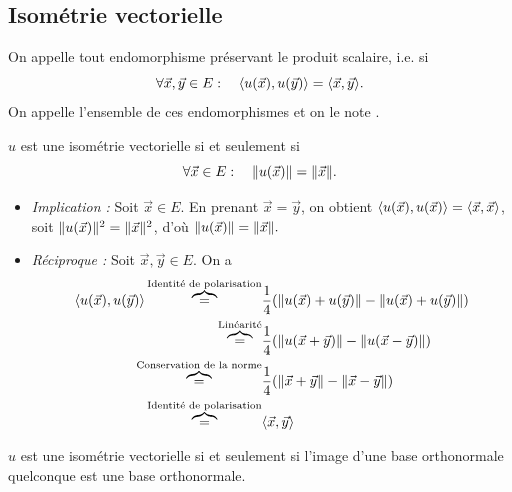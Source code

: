 \documentclass{book}
\begin{document}
\subsection{Isométrie vectorielle}
\begin{Definition}
On appelle  tout endomorphisme préservant le produit scalaire, i.e. si
$$ \forall \vec{x},\vec{y}\in E:\quad \langle u(\vec{x}), u(\vec{y})\rangle =\langle\vec{x},\vec{y}\rangle. $$ 
On appelle  l'ensemble de ces endomorphismes et on le note
.
\end{Definition}
\begin{Proposition}
$u$ est une isométrie vectorielle si et seulement si 
$$ \forall \vec{x}\in E:\quad \mathopen\lVert u(\vec{x}) \mathclose\rVert =\mathopen\lVert \vec{x} \mathclose\rVert. $$ 
\end{Proposition}
\begin{Demonstration}
\begin{itemize}
\item \textit{Implication :} Soit $\vec{x}\in E$.  En prenant  $\vec{x}= \vec{y}$, on obtient $\langle u(\vec{x}), u(\vec{x})\rangle =\langle\vec{x},\vec{x}\rangle$, soit $\mathopen\lVert u(\vec{x}) \mathclose\rVert^2 =\mathopen\lVert \vec{x} \mathclose\rVert^2$, d'où $\mathopen\lVert u(\vec{x}) \mathclose\rVert =\mathopen\lVert \vec{x} \mathclose\rVert.$
\item \textit{Réciproque :} Soit $\vec{x},\vec{y}\in E$. On a 
$$\begin{aligned}
\langle u(\vec{x}), u(\vec{y})\rangle\overbrace{=}^{\text{Identité de polarisation}}&\frac{1}{4}(\mathopen\lVert u(\vec{x})+u(\vec{y}) \mathclose\rVert-\mathopen\lVert u(\vec{x})+u(\vec{y}) \mathclose\rVert )\\
\overbrace{=}^{\text{Linéarité}}&\frac{1}{4}(\mathopen\lVert u(\vec{x}+\vec{y}) \mathclose\rVert-\mathopen\lVert u(\vec{x}-\vec{y}) \mathclose\rVert )\\
\overbrace{=}^{\text{Conservation de la norme}}&\frac{1}{4}(\mathopen\lVert \vec{x}+\vec{y} \mathclose\rVert-\mathopen\lVert \vec{x}-\vec{y} \mathclose\rVert )\\
\overbrace{=}^{\text{Identité de polarisation}}&\langle\vec{x}, \vec{y}\rangle
\end{aligned}$$
\end{itemize}
\end{Demonstration}
\begin{Proposition}
$u$ est une isométrie vectorielle si et seulement si l'image d'une base orthonormale quelconque est une base orthonormale.
\end{Proposition}
\end{document}
